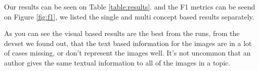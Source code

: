 \documentclass{sig-alternate}
\begin{document}
Our results can be seen on Table \ref{table:results}. and the F1 metrics can be seend on Figure \ref{fig:f1}, we listed the single and multi concept based results separately. 

As you can see the visual based results are the best from the runs, from the devset we found out, that the text based information for the images are in a lot of cases missing, or don't represent the images well. It's not uncommon that an author gives the same textual information to all of the images in a topic.



\end{document}
